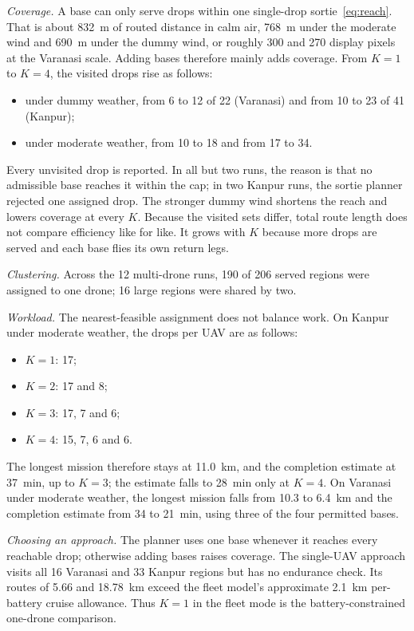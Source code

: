 \emph{Coverage.} A base can only serve drops within one single-drop sortie~\eqref{eq:reach}. That is about 832~m of routed distance in calm air, 768~m under the moderate wind and 690~m under the dummy wind, or roughly 300 and 270 display pixels at the Varanasi scale. Adding bases therefore mainly adds coverage. From $K=1$ to $K=4$, the visited drops rise as follows:
\begin{itemize}
\item under dummy weather, from 6 to 12 of 22 (Varanasi) and from 10 to 23 of 41 (Kanpur);
\item under moderate weather, from 10 to 18 and from 17 to 34.
\end{itemize}
Every unvisited drop is reported. In all but two runs, the reason is that no admissible base reaches it within the cap; in two Kanpur runs, the sortie planner rejected one assigned drop. The stronger dummy wind shortens the reach and lowers coverage at every $K$. Because the visited sets differ, total route length does not compare efficiency like for like. It grows with $K$ because more drops are served and each base flies its own return legs.

\emph{Clustering.} Across the 12 multi-drone runs, 190 of 206 served regions were assigned to one drone; 16 large regions were shared by two.\par

\emph{Workload.} The nearest-feasible assignment does not balance work. On Kanpur under moderate weather, the drops per UAV are as follows:
\begin{itemize}
\item $K=1$: 17;
\item $K=2$: 17 and 8;
\item $K=3$: 17, 7 and 6;
\item $K=4$: 15, 7, 6 and 6.
\end{itemize}
The longest mission therefore stays at 11.0~km, and the completion estimate at 37~min, up to $K=3$; the estimate falls to 28~min only at $K=4$. On Varanasi under moderate weather, the longest mission falls from 10.3 to 6.4~km and the completion estimate from 34 to 21~min, using three of the four permitted bases.

\emph{Choosing an approach.} The planner uses one base whenever it reaches every reachable drop; otherwise adding bases raises coverage. The single-UAV approach visits all 16 Varanasi and 33 Kanpur regions but has no endurance check. Its routes of 5.66 and 18.78~km exceed the fleet model's approximate 2.1~km per-battery cruise allowance. Thus $K=1$ in the fleet mode is the battery-constrained one-drone comparison.

